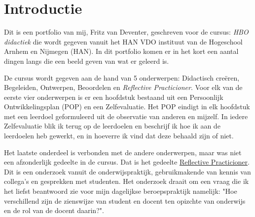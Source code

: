 
\section{Introductie}
Dit is een portfolio van mij, Fritz van Deventer, geschreven voor de cursus: \textit{HBO didactiek} die wordt gegeven vanuit het HAN VDO instituut van de Hogeschool Arnhem en Nijmegen (HAN).
In dit portfolio komen er in het kort een aantal dingen langs die een beeld geven van wat er geleerd is.

De cursus wordt gegeven aan de hand van 5 onderwerpen: Didactisch creëren, Begeleiden, Ontwerpen, Beoordelen en \textit{Reflective Practicioner}. Voor elk van de eerste vier onderwerpen is er een hoofdstuk bestaand uit een Persoonlijk Ontwikkelingsplan (POP) en een Zelfevaluatie. Het POP eindigt in elk hoofdstuk met een leerdoel geformuleerd uit de observatie van anderen en mijzelf. In iedere Zelfevaluatie blik ik terug op de leerdoelen en beschrijf ik hoe ik aan de leerdoelen heb gewerkt, en in hoeverre ik vind dat deze behaald zijn of niet.

Het laatste onderdeel is verbonden met de andere onderwerpen, maar was niet een afzonderlijk gedeelte in de cursus. Dat is het gedeelte \hyperref[sec:RP]{Reflective Practicioner}. Dit is een onderzoek vanuit de onderwijspraktijk, gebruikmakende van kennis van collega's en gesprekken met studenten. Het onderzoek draait om een vraag die ik het liefst beantwoord zie voor mijn dagelijkse beroepspraktijk namelijk: "Hoe verschillend zijn de zienswijze van student en docent ten opizchte van onderwijs en de rol van de docent daarin?".
